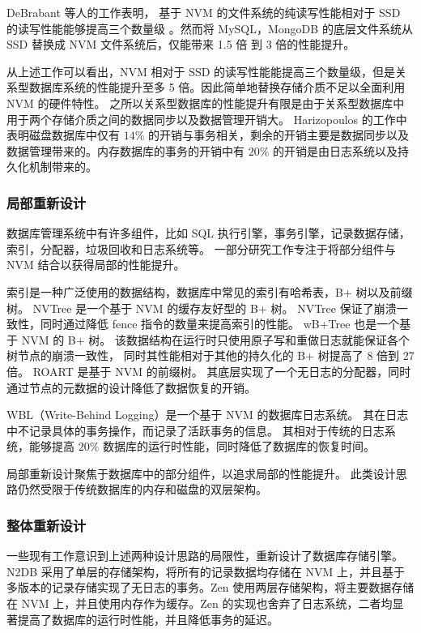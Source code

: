 DeBrabant 等人的工作表明，
基于 NVM 的文件系统的纯读写性能相对于 SSD 的读写性能能够提高三个数量级
\cite{debrabant_prolegomenon_2014}。然而将 MySQL，MongoDB 的底层文件系统从 SSD 替换成 NVM 文件系统后，仅能带来 1.5 倍 到 3 倍的性能提升。

从上述工作可以看出，NVM 相对于 SSD 的读写性能能提高三个数量级，但是关系型数据库系统的性能提升至多 5 倍。因此简单地替换存储介质不足以全面利用 NVM 的硬件特性。
之所以关系型数据库的性能提升有限是由于关系型数据库中用于两个存储介质之间的数据同步以及数据管理开销大。
Harizopoulos 的工作中表明磁盘数据库中仅有 $14\%$ 的开销与事务相关，剩余的开销主要是数据同步以及数据管理带来的\cite{harizopoulos_oltp_2018}。内存数据库的事务的开销中有 $20\%$ 的开销是由日志系统以及持久化机制带来的。


\subsubsection{局部重新设计}

数据库管理系统中有许多组件，比如 SQL 执行引擎，事务引擎，记录数据存储，索引，分配器，垃圾回收和日志系统等。
一部分研究工作专注于将部分组件与 NVM 结合以获得局部的性能提升。

索引是一种广泛使用的数据结构，数据库中常见的索引有哈希表，B+ 树以及前缀树。
NVTree 是一个基于 NVM 的缓存友好型的 B+ 树\cite{nv-tree}。
NVTree 保证了崩溃一致性，同时通过降低 fence 指令的数量来提高索引的性能。
wB+Tree 也是一个基于 NVM 的 B+ 树\cite{chen2015persistent}。
该数据结构在运行时只使用原子写和重做日志就能保证各个树节点的崩溃一致性，
同时其性能相对于其他的持久化的 B+ 树提高了 8 倍到 27 倍。
ROART 是基于 NVM 的前缀树\cite{ma_roart_2021}。
其底层实现了一个无日志的分配器，同时通过节点的元数据的设计降低了数据恢复的开销。

WBL（Write-Behind Logging）是一个基于 NVM 的数据库日志系统\cite{wbl}。
其在日志中不记录具体的事务操作，而记录了活跃事务的信息。
其相对于传统的日志系统，能够提高 $20\%$ 数据库的运行时性能，同时降低了数据库的恢复时间。

局部重新设计聚焦于数据库中的部分组件，以追求局部的性能提升。
此类设计思路仍然受限于传统数据库的内存和磁盘的双层架构。

\subsubsection{整体重新设计}

一些现有工作意识到上述两种设计思路的局限性，重新设计了数据库存储引擎。N2DB 采用了单层的存储架构，将所有的记录数据均存储在 NVM 上，并且基于多版本的记录存储实现了无日志的事务\cite{liu_graduate_chinese}。Zen 使用两层存储架构，将主要数据存储在 NVM 上，并且使用内存作为缓存。Zen 的实现也舍弃了日志系统，二者均显著提高了数据库的运行时性能，并且降低事务的延迟\cite{liu_zen_2021}。


